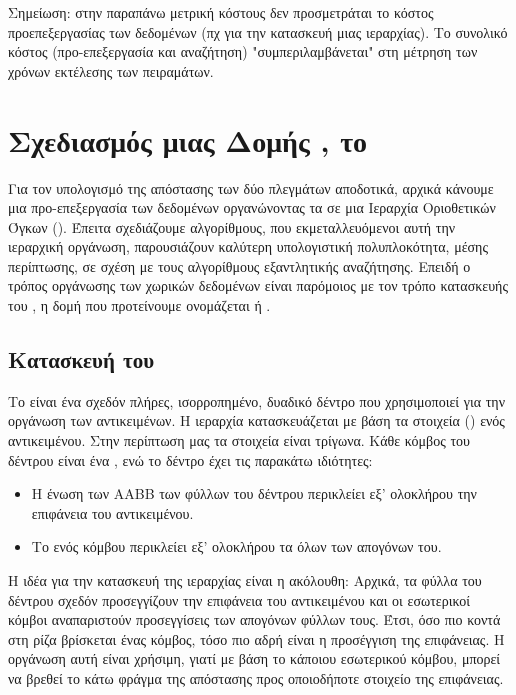 Σημείωση: στην παραπάνω μετρική κόστους δεν προσμετράται το κόστος προεπεξεργασίας 
των δεδομένων (πχ για την κατασκευή μιας ιεραρχίας).
Το συνολικό κόστος (προ-επεξεργασία και αναζήτηση) "συμπεριλαμβάνεται" στη
μέτρηση των χρόνων εκτέλεσης των πειραμάτων.


\section{Σχεδιασμός μιας Δομής , το }
\label{sec:design_bvh}
Για τον υπολογισμό της απόστασης των δύο πλεγμάτων αποδοτικά, 
αρχικά κάνουμε μια προ-επεξεργασία των δεδομένων οργανώνοντας 
τα σε μια Ιεραρχία Οριοθετικών Όγκων ().
Έπειτα σχεδιάζουμε αλγορίθμους, που εκμεταλλευόμενοι αυτή την 
ιεραρχική οργάνωση, παρουσιάζουν καλύτερη υπολογιστική πολυπλοκότητα,
μέσης περίπτωσης, σε σχέση με τους αλγορίθμους εξαντλητικής αναζήτησης.
Επειδή ο τρόπος οργάνωσης των χωρικών δεδομένων είναι παρόμοιος  
με τον τρόπο κατασκευής του , η δομή που προτείνουμε 
ονομάζεται  ή .

\subsection{Κατασκευή του }
Το  είναι ένα σχεδόν πλήρες, ισορροπημένο, δυαδικό δέντρο
που χρησιμοποιεί  για την οργάνωση των αντικειμένων. 
Η ιεραρχία κατασκευάζεται με βάση τα στοιχεία ()
ενός αντικειμένου.
Στην περίπτωση μας τα στοιχεία είναι τρίγωνα.
Κάθε κόμβος του δέντρου είναι ένα , ενώ το δέντρο έχει τις 
παρακάτω ιδιότητες:
\begin{itemize}
    \item Η ένωση των AABB των φύλλων του δέντρου περικλείει εξ' 
    ολοκλήρου την επιφάνεια του αντικειμένου.
    \item Το  ενός κόμβου περικλείει εξ' ολοκλήρου τα 
     όλων των απογόνων του. 
\end{itemize}

Η ιδέα για την κατασκευή της ιεραρχίας είναι η ακόλουθη:
Αρχικά, τα φύλλα του δέντρου σχεδόν προσεγγίζουν την επιφάνεια του αντικειμένου και
οι εσωτερικοί κόμβοι αναπαριστούν προσεγγίσεις των απογόνων φύλλων τους.
Έτσι, όσο πιο κοντά στη ρίζα βρίσκεται ένας κόμβος, τόσο πιο αδρή είναι η 
προσέγγιση της επιφάνειας.
Η οργάνωση αυτή είναι χρήσιμη, γιατί με βάση το  κάποιου εσωτερικού 
κόμβου, μπορεί να βρεθεί το κάτω φράγμα της απόστασης προς οποιοδήποτε στοιχείο
της επιφάνειας.

